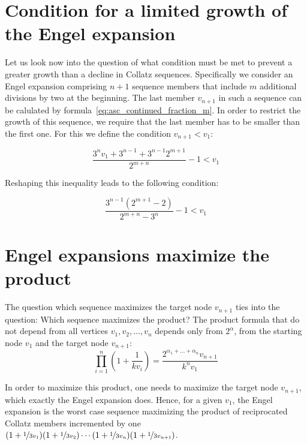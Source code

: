 \documentclass[12pt]{amsart}
\theoremstyle{definition}
\begin{document}
\section{Condition for a limited growth of the Engel expansion}
\label{sec:condition_limited_growth}
Let us look now into the question of what condition must be met to prevent a greater growth than a decline in Collatz sequences. Specifically we consider an Engel expansion comprising $n+1$ sequence members that include $m$ additional divisions by two at the beginning. The last member $v_{n+1}$ in such a sequence can be calulated by formula~\ref{eq:asc_continued_fraction_m}. In order to restrict the growth of this sequence, we require that the last member has to be smaller than the first one. For this we define the condition $v_{n+1}<v_1$:

\[
\frac{3^nv_1+3^{n-1}+3^{n-1}2^{m+1}}{2^{m+n}}-1<v_1
\]

\par\medskip\noindent
Reshaping this inequality leads to the following condition:

\begin{equation}
\label{eq:condition_limited_growth}
\frac{3^{n-1}\left(2^{m+1}-2\right)}{2^{m+n}-3^n}-1<v_1
\end{equation}

\section{Engel expansions maximize the product}
The question which sequence maximizes the target node $v_{n+1}$ ties into the question: Which sequence maximizes the product? The product formula that do not depend from all vertices $v_1,v_2,\ldots,v_n$ depends only from $2^\alpha$, from the starting node $v_1$ and the target node $v_{n+1}$:
\[
\prod_{i=1}^{n}\left(1+\frac{1}{kv_i}\right)=\frac{2^{\alpha_1+\ldots+\alpha_n}v_{n+1}}{k^nv_1}
\]

\par\medskip
In order to maximize this product, one needs to maximize the target node $v_{n+1}$, which exactly the Engel expansion does. Hence, for a given $v_1$, the Engel expansion is the worst case sequence maximizing the product of reciprocated Collatz members incremented by one $(1+\nicefrac{1}{3v_1})(1+\nicefrac{1}{3v_2})\cdots(1+\nicefrac{1}{3v_n})(1+\nicefrac{1}{3v_{n+1}})$.



\end{document}
